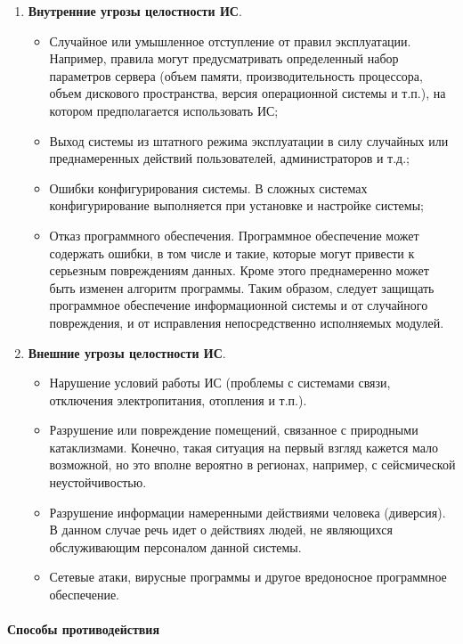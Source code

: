 \begin{enumerate}
\item \textbf{Внутренние угрозы целостности ИС}.
    \begin{itemize}
        \item Случайное или умышленное отступление от правил эксплуатации. Например, правила могут предусматривать определенный набор параметров сервера (объем памяти, производительность процессора, объем дискового пространства, версия операционной системы и т.п.), на котором предполагается использовать ИС;
        \item Выход системы из штатного режима эксплуатации в силу случайных или преднамеренных действий пользователей, администраторов и т.д.;
        \item Ошибки конфигурирования системы. В сложных системах конфигурирование выполняется при установке и настройке системы;
        \item Отказ программного обеспечения. Программное обеспечение может содержать ошибки, в том числе и такие, которые могут привести к серьезным повреждениям данных. Кроме этого преднамеренно может быть изменен алгоритм программы. Таким образом, следует защищать программное обеспечение информационной системы и от случайного повреждения, и от исправления непосредственно исполняемых модулей.
    \end{itemize}

\item \textbf{Внешние угрозы целостности ИС}.
    \begin{itemize}
        \item Нарушение условий работы ИС (проблемы с системами связи, отключения электропитания, отопления и т.п.).
        \item Разрушение или повреждение помещений, связанное с природными катаклизмами. Конечно, такая ситуация на первый взгляд кажется мало возможной, но это вполне вероятно в регионах, например, с сейсмической неустойчивостью.
        \item Разрушение информации намеренными действиями человека (диверсия). В данном случае речь идет о действиях людей, не являющихся обслуживающим персоналом данной системы.
        \item Сетевые атаки, вирусные программы и другое вредоносное программное обеспечение.
    \end{itemize}
\end{enumerate}

\paragraph{Способы противодействия} ~\\

